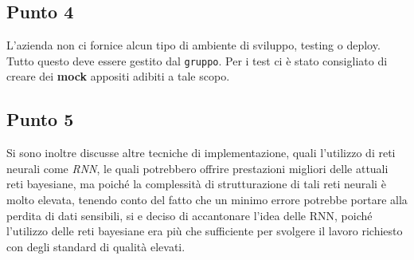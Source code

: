 \subsection{Punto 4}
L'azienda non ci fornice alcun tipo di ambiente di sviluppo, testing o deploy. Tutto questo deve essere 
gestito dal \texttt{gruppo}. Per i test ci è stato consigliato di creare dei \textbf{mock} appositi adibiti a tale scopo. 

\subsection{Punto 5}
Si sono inoltre discusse altre tecniche di implementazione, quali l'utilizzo di reti neurali come \textit{RNN}, 
le quali potrebbero offrire prestazioni migliori delle attuali reti bayesiane, ma poiché la complessità di 
strutturazione di tali reti neurali è molto elevata, tenendo conto del fatto che un minimo errore potrebbe 
portare alla perdita di dati sensibili, si e deciso di accantonare l'idea delle RNN, poiché l'utilizzo delle reti 
bayesiane era più che sufficiente per svolgere il lavoro richiesto con degli standard di qualità elevati. 

